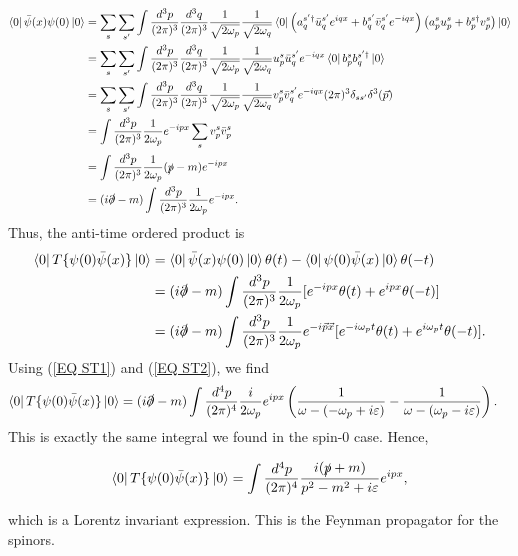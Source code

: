 \documentclass[11pt]{article}
\theoremstyle{definition}
\begin{document}
\begin{equation}
    \begin{aligned}
        \bra{0}\bar{\psi}(x)\psi(0)\ket{0} &=  \sum_{s}\sum_{s'}\int\frac{d^{3}p}{(2\pi)^{3}}\frac{d^{3}q}{(2\pi)^{3}}\frac{1}{\sqrt{2\omega_{p}}}\frac{1}{\sqrt{2\omega_{q}}}\bra{0}\left(a_{q}^{s'\dagger}\bar{u}_{q}^{s'}e^{iqx}+b_{q}^{s'}\bar{v}_{q}^{s'}e^{-iqx}\right)\left(a_{p}^{s}u_{p}^{s}+ b_{p}^{s\dagger}v_{p}^{s}\right)\ket{0} \\
        &= \sum_{s}\sum_{s'}\int\frac{d^{3}p}{(2\pi)^{3}}\frac{d^{3}q}{(2\pi)^{3}}\frac{1}{\sqrt{2\omega_{p}}}\frac{1}{\sqrt{2\omega_{q}}}u_{p}^{s}\bar{u}_{q}^{s'}e^{-iqx}\bra{0}b_{p}^{s}b_{q}^{s'\dagger}\ket{0} \\
        &= \sum_{s}\sum_{s'}\int\frac{d^{3}p}{(2\pi)^{3}}\frac{d^{3}q}{(2\pi)^{3}}\frac{1}{\sqrt{2\omega_{p}}}\frac{1}{\sqrt{2\omega_{q}}}v_{p}^{s}\bar{v}_{q}^{s'}e^{-iqx}(2\pi)^3\delta_{ss'}\delta^3({\vec{p}}) \\
        &= \int\frac{d^{3}p}{(2\pi)^{3}}\frac{1}{2\omega_p}e^{-ipx}\sum_{s}v_{p}^{s}\bar{v}_{p}^{s} \\
        &= \int\frac{d^{3}p}{(2\pi)^{3}}\frac{1}{2\omega_p}(\slashed{p}-m)e^{-ipx} \\
        &= (i\slashed{\partial}-m)\int\frac{d^{3}p}{(2\pi)^{3}}\frac{1}{2\omega_p}e^{-ipx}.
    \end{aligned}
\end{equation}
Thus, the anti-time ordered product is
\begin{equation}
\begin{aligned}
    \bra{0}T\{\psi(0)\bar{\psi}(x)\}\ket{0} &= \bra{0}\bar{\psi}(x)\psi(0)\ket{0}\theta(t) - \bra{0}\psi(0)\bar{\psi}(x)\ket{0}\theta(-t)\\
    &= (i\slashed{\partial}-m)\int\frac{d^{3}p}{(2\pi)^{3}}\frac{1}{2\omega_p}[e^{-ipx}\theta(t) + e^{ipx}\theta(-t)]\\
    &= (i\slashed{\partial}-m)\int\frac{d^{3}p}{(2\pi)^{3}}\frac{1}{2\omega_p}e^{-i\vec{p}\vec{x}}[e^{-i\omega_pt}\theta(t) + e^{i\omega_pt}\theta(-t)].
\end{aligned}
\end{equation}
Using (\ref{EQ ST1}) and (\ref{EQ ST2}), we find
\begin{equation}
    \begin{aligned}
        \bra{0}T\{\psi(0)\bar{\psi}(x)\}\ket{0} &= (i\slashed{\partial}-m)\int\frac{d^{4}p}{(2\pi)^{4}}\frac{i}{2\omega_p}e^{ipx}\left(\frac{1}{\omega-(-\omega_p+i\varepsilon)} - \frac{1}{\omega-(\omega_p-i\varepsilon)}   \right).
    \end{aligned}
\end{equation}
This is exactly the same integral we found in the spin-0 case. Hence,
\begin{shaded}
    \begin{equation}
        \bra{0}T\{\psi(0)\bar{\psi}(x)\}\ket{0} = \int\frac{d^{4}p}{(2\pi)^{4}}\frac{i(\slashed{p}+m)}{p^2-m^2+i\varepsilon}e^{ipx},
    \end{equation}
\end{shaded}
which is a Lorentz invariant expression. This is the Feynman propagator for the spinors. 
\end{document}
